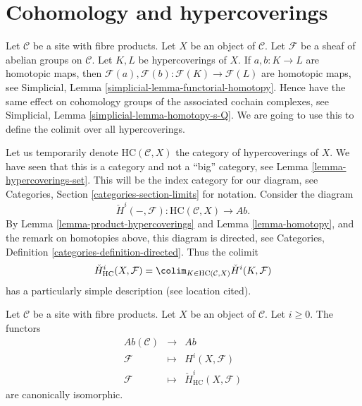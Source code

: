 \section{Cohomology and hypercoverings}
\label{section-cohomology}

\noindent
Let $\mathcal{C}$ be a site with fibre products.
Let $X$ be an object of $\mathcal{C}$.
Let $\mathcal{F}$ be a sheaf of abelian groups on $\mathcal{C}$.
Let $K, L$ be hypercoverings of $X$.
If $a, b : K \to L$ are homotopic maps,
then $\mathcal{F}(a), \mathcal{F}(b) : \mathcal{F}(K) \to \mathcal{F}(L)$
are homotopic maps, see
Simplicial, Lemma \ref{simplicial-lemma-functorial-homotopy}.
Hence have the same effect on cohomology groups of the associated
cochain complexes, see
Simplicial, Lemma \ref{simplicial-lemma-homotopy-s-Q}.
We are going to use this to define the colimit over all
hypercoverings.

\medskip\noindent
Let us temporarily denote $\text{HC}(\mathcal{C}, X)$
the category of hypercoverings of $X$. We have seen that
this is a category and not a ``big'' category,
see Lemma \ref{lemma-hypercoverings-set}.
This will be the index category for our diagram, see
Categories, Section \ref{categories-section-limits} for notation.
Consider the diagram
$$
\check{H}^i(-, \mathcal{F}) :
\text{HC}(\mathcal{C}, X)
\longrightarrow
\textit{Ab}.
$$
By Lemma \ref{lemma-product-hypercoverings} and
Lemma \ref{lemma-homotopy}, and the remark on homotopies above,
this diagram is directed, see
Categories, Definition \ref{categories-definition-directed}.
Thus the colimit
$$
\check{H}^i_{\text{HC}}(X, \mathcal{F})
=
\colim_{K \in \text{HC}(\mathcal{C}, X)}
\check{H}^i(K, \mathcal{F})
$$
has a particularly simple description (see location cited).

\begin{theorem}
\label{theorem-cohomology-hypercoverings}
Let $\mathcal{C}$ be a site with fibre products.
Let $X$ be an object of $\mathcal{C}$. Let $i \geq 0$.
The functors
\begin{eqnarray*}
\textit{Ab}(\mathcal{C}) & \longrightarrow & \textit{Ab} \\
\mathcal{F} & \longmapsto & H^i(X, \mathcal{F}) \\
\mathcal{F} & \longmapsto & \check{H}^i_{\text{HC}}(X, \mathcal{F})
\end{eqnarray*}
are canonically isomorphic.
\end{theorem}

